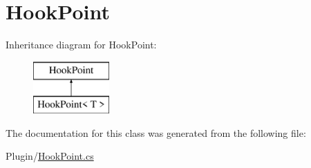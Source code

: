 \hypertarget{classOTA_1_1Plugin_1_1HookPoint}{}\section{Hook\+Point}
\label{classOTA_1_1Plugin_1_1HookPoint}
Inheritance diagram for Hook\+Point\+:\begin{figure}[H]
\begin{center}
\leavevmode
\includegraphics[height=2.000000cm]{classOTA_1_1Plugin_1_1HookPoint}
\end{center}
\end{figure}


The documentation for this class was generated from the following file\+:\begin{DoxyCompactItemize}
\item 
Plugin/\hyperlink{HookPoint_8cs}{Hook\+Point.\+cs}\end{DoxyCompactItemize}
